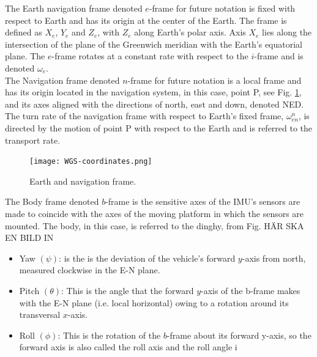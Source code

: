 The Earth navigation frame denoted $e$-frame for future notation is fixed with respect to Earth and has its origin at the center of the Earth. The frame is defined as $X_e$, $Y_e$ and $Z_e$, with $Z_e$ along Earth's polar axis. Axis $X_e$ lies along the intersection of the plane of the Greenwich meridian with the Earth's equatorial plane. The $e$-frame rotates at a constant rate with respect to the $i$-frame and is denoted $\omega_e$.\\

The Navigation frame denoted $n$-frame for future notation is a local frame and has its origin located in the navigation system, in this case, point P, see Fig. \ref{WGS}, and its axes aligned with the directions of north, east and down, denoted NED. The turn rate of the navigation frame with respect to Earth's fixed frame, $\omega_{en}^n$, is directed by the motion of point P with respect to the Earth and is referred to the transport rate.   

\begin{figure}[H]
\centering
\texttt{[image: WGS-coordinates.png]}
\caption{Earth and navigation frame.}
\label{WGS}
\end{figure}

The Body frame denoted $b$-frame is the sensitive axes of the IMU's sensors are made to coincide with the axes of the moving platform in which the sensors are mounted. The body, in this case, is referred to the dinghy, from Fig. HÄR SKA EN BILD IN
\begin{itemize}
\item Yaw $(\psi)$: is the is the deviation of the vehicle’s forward $y$-axis from north, measured clockwise in the E-N plane.
\item Pitch $(\theta)$: This is the angle that the forward $y$-axis of the b-frame makes with the
E-N plane (i.e. local horizontal) owing to a rotation around its transversal $x$-axis.
\item Roll $(\phi)$: This is the rotation of the $b$-frame about its forward y-axis, so the
forward axis is also called the roll axis and the roll angle i
\end{itemize}

